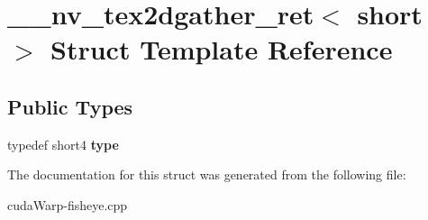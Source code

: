 \hypertarget{struct____nv__tex2dgather__ret_3_01short_01_4}{}\section{\+\_\+\+\_\+nv\+\_\+tex2dgather\+\_\+ret$<$ short $>$ Struct Template Reference}
\label{struct____nv__tex2dgather__ret_3_01short_01_4}
\subsection*{Public Types}
\begin{DoxyCompactItemize}
\item 
typedef short4 {\bfseries type}\hypertarget{struct____nv__tex2dgather__ret_3_01short_01_4_a100901e0520d373a380a61b78607432f}{}\label{struct____nv__tex2dgather__ret_3_01short_01_4_a100901e0520d373a380a61b78607432f}

\end{DoxyCompactItemize}


The documentation for this struct was generated from the following file\+:\begin{DoxyCompactItemize}
\item 
cuda\+Warp-\/fisheye.\+cpp\end{DoxyCompactItemize}
